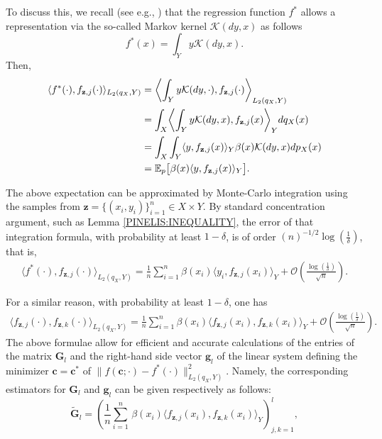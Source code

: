 \documentclass[twoside,11pt]{article}
\begin{document}
To discuss this, we recall (see e.g., \cite{meunier2024optimal}) that the regression function $f^*$ allows a representation via the so-called Markov kernel $\mathcal{K}(dy,x)$ as follows
{$$f^*(x) = \int_{Y}y \mathcal{K}(dy,x).$$} Then,
\begin{align} \label{eq4.5.5}
\langle f^*(\cdot),f_{\textbf{z},j}(\cdot)\rangle_{L_2(q_X,Y)} &= \biggl \langle \int_{Y}y \mathcal{K}(dy,\cdot),f_{\textbf{z},j}(\cdot)\biggr \rangle_{L_2(q_X,Y)} \notag \\ 
&= \int_{X}\biggl\langle \int_{Y}y \mathcal{K}(dy,x),f_{\textbf{z},j}(x)\biggr\rangle_{Y}dq_X(x) \notag \\ 
&=  \int_{X}\int_{Y}\langle y,f_{\textbf{z},j}(x)\rangle_{Y}\beta(x) \mathcal{K}(dy,x)dp_X(x) \notag \\  
&= \mathbb{E}_p\bigl[\beta(x) \langle y,f_{\textbf{z},j}(x)\rangle_{Y}\bigr].
\end{align}

The above expectation can be approximated by Monte-Carlo integration using the samples from $\mathbf{z} =\{(x_i, y_i)\}_{i=1}^n \in X \times Y$. By standard concentration argument, such as Lemma \ref{PINELIS:INEQUALITY}, the error of that integration formula, with probability at least $1 -\delta$, is of order $(n)^{-1/2}\log(\frac{1}{\delta})$, that is, 
\begin{align} \label{eq:monte1}
\langle f^*(\cdot),f_{\textbf{z},j}(\cdot)\rangle_{L_2(q_X,Y)} = \frac{1}{n}\sum_{i=1}^{n} \beta(x_i) \langle y_i,f_{\textbf{z},j}(x_i)\rangle_{Y} + \mathcal{O}\left( \frac{\log (\frac{1}{\delta})}{\sqrt{n} }\right).
\end{align}

For a similar reason, with probability at least $1 -\delta$, one has
\begin{align} \label{eq:monte3}
\langle  f_{\textbf{z},j}(\cdot),f_{\textbf{z},k}(\cdot)\rangle_{L_2(q_X,Y)}  = \frac{1}{n}\sum_{i=1}^{n} \beta(x_i) \langle f_{\textbf{z},j}(x_i),f_{\textbf{z},k}(x_i)\rangle_{Y}+ \mathcal{O}\left( \frac{\log(\frac{1}{\delta})}{\sqrt{n} }\right).
\end{align}
The above formulae allow for efficient and accurate calculations of the entries of the matrix $\mathbf{G}_l$ and the right-hand side vector $\mathbf{g}_l$ of the linear system defining the minimizer $\mathbf{c} = \mathbf{c}^*$ of $\big\|f(\mathbf{c};\cdot) - f^*(\cdot)\big\|^2_{L_2(q_X,Y)}$. Namely, the corresponding estimators for $\mathbf{G}_l$ and $\mathbf{g}_l$ can be given respectively as follows:
\begin{equation}\label{agg G}
\widetilde{\mathbf{G}}_l 
= \left( \frac{1}{n} \sum_{i=1}^{n}  
   \, \beta(x_i) \langle f_{\mathbf{z},j}(x_i),f_{\mathbf{z},k}(x_i)\rangle_{Y} \right)_{j,k=1}^{l},
\end{equation}
\end{document}
